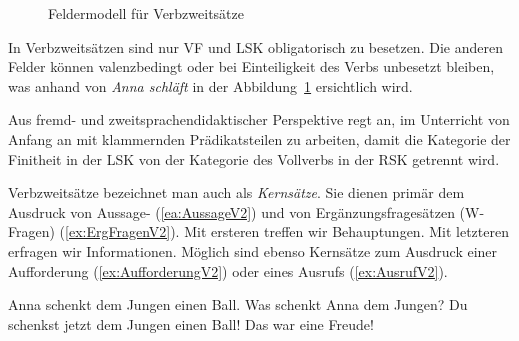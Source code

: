 \begin{figure}[!htbp]
  \centering
  \caption{Feldermodell für Verbzweitsätze}
  \label{fig:FeldermodelV2voll}
\end{figure}

In Verbzweitsätzen sind nur VF und LSK obligatorisch zu besetzen. Die anderen Felder können valenzbedingt oder bei Einteiligkeit des Verbs unbesetzt bleiben, was anhand von \textit{Anna schläft} in der Abbildung~\ref{fig:FeldermodelV2voll} ersichtlich wird.

Aus fremd- und zweitsprachendidaktischer Perspektive regt \citet[75--76]{Dimroth2009} an, im Unterricht von Anfang an mit klammernden Prädikatsteilen zu arbeiten, damit die Kategorie der Finitheit in der LSK von der Kategorie des Vollverbs in der RSK getrennt wird. 

Verbzweitsätze bezeichnet man auch als \textit{Kernsätze}. Sie dienen primär dem Ausdruck von Aussage- (\ref{ea:AussageV2}) und von Ergänzungsfragesätzen (W-Fragen) (\ref{ex:ErgFragenV2}). Mit ersteren treffen wir Behauptungen. Mit letzteren erfragen wir Informationen. Möglich sind ebenso Kernsätze zum Ausdruck einer Aufforderung (\ref{ex:AufforderungV2}) oder eines Ausrufs (\ref{ex:AusrufV2}).

\ea \label{ea:SatzartenV2}
\ea \label{ea:AussageV2} Anna schenkt dem Jungen einen Ball.
\ex \label{ex:ErgFragenV2} Was schenkt Anna dem Jungen?
\ex \label{ex:AufforderungV2} Du schenkst jetzt dem Jungen einen Ball!
\ex \label{ex:AusrufV2} Das war eine Freude!
\z 
\z 

